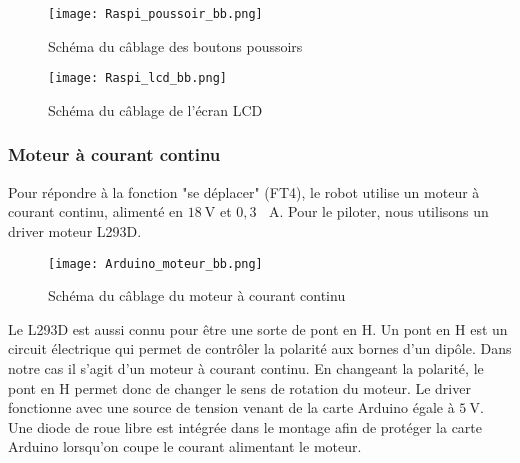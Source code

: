 \documentclass[12pt,a4paper]{article}
\begin{document}
	\begin{figure}[ht!]
		\centering
			\texttt{[image: Raspi\_poussoir\_bb.png]}
			\caption[Schéma du câblage des boutons poussoirs - Illustration réalisée par notre groupe, disponible à l'adresse : \url{https://github.com/thaspdev/PATRICK/blob/master/circuits/Raspi_poussoir/Raspi_poussoir_bb.png}, ainsi qu'à cette adresse au format Fritzing : \url{https://github.com/thaspdev/PATRICK/blob/master/circuits/Raspi_poussoir/Raspi_poussoir.fzz}]{Schéma du câblage des boutons poussoirs\label{overflow}}
	\end{figure}
	
	\begin{figure}[ht!]
		\centering
			\texttt{[image: Raspi\_lcd\_bb.png]}
			\caption[Schéma du câblage de l'écran LCD - Illustration réalisée par notre groupe, disponible à l'adresse : \url{https://github.com/thaspdev/PATRICK/blob/master/circuits/Raspi_lcd/Raspi_lcd_bb.png}, ainsi qu'à cette adresse au format Fritzing : \url{https://github.com/thaspdev/PATRICK/blob/master/circuits/Raspi_lcd/Raspi_lcd.fzz}]{Schéma du câblage de l'écran LCD\label{overflow}}
	\end{figure}
	\newpage
	
	\subsubsection{Moteur à courant continu}
	
	Pour répondre à la fonction "se déplacer" (FT4), le robot utilise un moteur à courant continu, alimenté en $\SI{18}{\volt}$ et $0,3 \text{ } \SI{}{\ampere}$. Pour le piloter, nous utilisons un driver moteur L293D.
	
	\begin{figure}[ht!]
		\centering
			\texttt{[image: Arduino\_moteur\_bb.png]}
			\caption[Schéma du câblage du moteur à courant continu - Illustration réalisée par notre groupe, disponible à l'adresse : \url{https://github.com/thaspdev/PATRICK/blob/master/circuits/Arduino_moteur/Arduino_moteur_bb.png}, ainsi qu'à cette adresse au format Fritzing : \url{https://github.com/thaspdev/PATRICK/blob/master/circuits/Arduino_moteur/Arduino_moteur.fzz}]{Schéma du câblage du moteur à courant continu\label{overflow}}
	\end{figure}
	\newpage
	
	Le L293D est aussi connu pour être une sorte de pont en H. Un pont en H est un circuit électrique qui permet de contrôler la polarité aux bornes d’un dipôle. Dans notre cas il s’agit d’un moteur à courant continu.
En changeant la polarité, le pont en H permet donc de changer le sens de rotation du moteur.
Le driver fonctionne avec une source de tension venant de la carte Arduino égale à $\SI{5}{\volt}$.
Une diode de roue libre est intégrée dans le montage afin de protéger la carte Arduino lorsqu’on coupe le courant alimentant le moteur.
\end{document}
